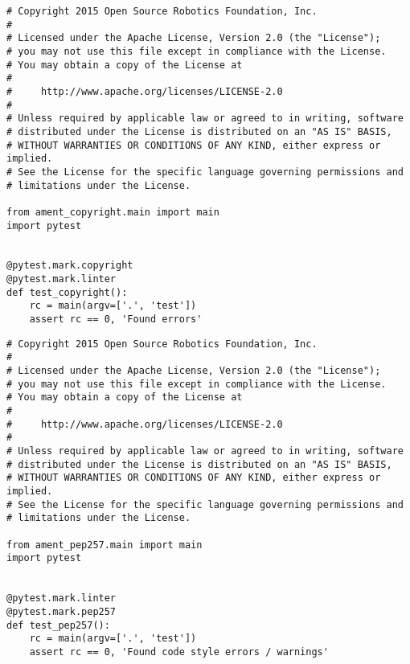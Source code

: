  \footnotesize
\begin{tcolorbox}[sharp corners, colframe=gray!80, colback=LightGray, left=0pt, top=0pt, bottom=0pt, title=\texttt{br2\_fsm\_bumpgo\_py/test/test\_copyright.py}]
  \begin{verbatim}
# Copyright 2015 Open Source Robotics Foundation, Inc.
#
# Licensed under the Apache License, Version 2.0 (the "License");
# you may not use this file except in compliance with the License.
# You may obtain a copy of the License at
#
#     http://www.apache.org/licenses/LICENSE-2.0
#
# Unless required by applicable law or agreed to in writing, software
# distributed under the License is distributed on an "AS IS" BASIS,
# WITHOUT WARRANTIES OR CONDITIONS OF ANY KIND, either express or implied.
# See the License for the specific language governing permissions and
# limitations under the License.

from ament_copyright.main import main
import pytest


@pytest.mark.copyright
@pytest.mark.linter
def test_copyright():
    rc = main(argv=['.', 'test'])
    assert rc == 0, 'Found errors'
    \end{verbatim}
    \end{tcolorbox}
  \normalsize

 \footnotesize
\begin{tcolorbox}[sharp corners, colframe=gray!80, colback=LightGray, left=0pt, top=0pt, bottom=0pt, title=\texttt{br2\_fsm\_bumpgo\_py/test/test\_pep257.py}]
  \begin{verbatim}
# Copyright 2015 Open Source Robotics Foundation, Inc.
#
# Licensed under the Apache License, Version 2.0 (the "License");
# you may not use this file except in compliance with the License.
# You may obtain a copy of the License at
#
#     http://www.apache.org/licenses/LICENSE-2.0
#
# Unless required by applicable law or agreed to in writing, software
# distributed under the License is distributed on an "AS IS" BASIS,
# WITHOUT WARRANTIES OR CONDITIONS OF ANY KIND, either express or implied.
# See the License for the specific language governing permissions and
# limitations under the License.

from ament_pep257.main import main
import pytest


@pytest.mark.linter
@pytest.mark.pep257
def test_pep257():
    rc = main(argv=['.', 'test'])
    assert rc == 0, 'Found code style errors / warnings'
    \end{verbatim}
    \end{tcolorbox}
  \normalsize

